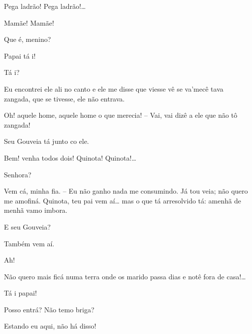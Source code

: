 
 Pega ladrão! Pega ladrão!\ldots{} 




  Mamãe! Mamãe!

  Que é, menino?

 Papai tá i!

 Tá i?

 Eu encontrei ele ali no canto e ele me disse que viesse vê se
va’mecê tava zangada, que se tivesse, ele não entrava.

 Oh! aquele home, aquele home o que merecia! -- Vai, vai dizê a
ele que não tô zangada!

 Seu Gouveia tá junto co ele.

 Bem! venha todos dois!  Quinota!
Quinota!\ldots{}

 Senhora?

 Vem cá, minha fia. -- Eu não ganho nada me consumindo. Já tou
veia; não quero me amofiná.  Quinota, teu pai vem aí\ldots{} mas o
que tá arresolvido tá: amenhã de menhã vamo imbora.

 E seu Gouveia?

 Também vem aí.

  Ah!

 Não quero mais ficá numa terra onde os marido passa dias e notê
fora de casa!\ldots{}


  Tá i papai!

  Posso entrá? Não temo briga?

 Estando eu aqui, não há disso!

